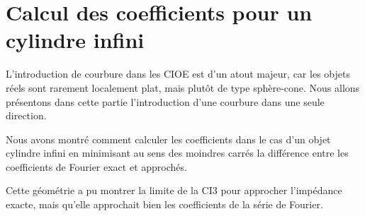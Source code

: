 \chapter{Calcul des coefficients pour un cylindre infini}
\label{sec:cylindre}
\minitoc
\newpage
{}
L'introduction de courbure dans les CIOE est d'un atout majeur, car les objets réels sont rarement localement plat, mais plutôt de type sphère-cone. Nous allons présentons dans cette partie l'introduction d'une courbure dans une seule direction.






Nous avons montré comment calculer les coefficients dans le cas d'un objet cylindre infini en minimisant au sens des moindres carrés la différence entre les coefficients de Fourier exact et approchés. 

Cette géométrie a pu montrer la limite de la CI3 pour approcher l'impédance exacte, mais qu'elle approchait bien les coefficients de la série de Fourier.
